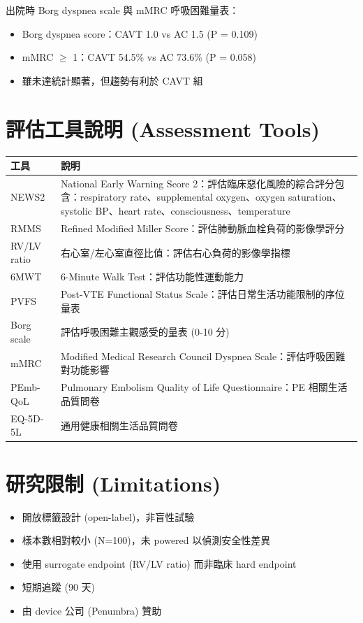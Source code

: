 \documentclass[11pt,a4paper]{article}
\begin{document}
出院時 Borg dyspnea scale 與 mMRC 呼吸困難量表：
\begin{itemize}[leftmargin=*,itemsep=2pt]
    \item Borg dyspnea score：CAVT 1.0 vs AC 1.5 (P = 0.109)
    \item mMRC $\geq$ 1：CAVT 54.5\% vs AC 73.6\% (P = 0.058)
    \item 雖未達統計顯著，但趨勢有利於 CAVT 組
\end{itemize}

\section{評估工具說明 (Assessment Tools)}

\begin{longtable}{p{3.5cm}p{10.5cm}}
\toprule
\textbf{工具} & \textbf{說明} \\
\midrule
\endfirsthead
\bottomrule
\endfoot
NEWS2 & National Early Warning Score 2：評估臨床惡化風險的綜合評分\newline 包含：respiratory rate、supplemental oxygen、oxygen saturation、systolic BP、heart rate、consciousness、temperature \\
\midrule
RMMS & Refined Modified Miller Score：評估肺動脈血栓負荷的影像學評分 \\
\midrule
RV/LV ratio & 右心室/左心室直徑比值：評估右心負荷的影像學指標 \\
\midrule
6MWT & 6-Minute Walk Test：評估功能性運動能力 \\
\midrule
PVFS & Post-VTE Functional Status Scale：評估日常生活功能限制的序位量表 \\
\midrule
Borg scale & 評估呼吸困難主觀感受的量表 (0-10 分) \\
\midrule
mMRC & Modified Medical Research Council Dyspnea Scale：評估呼吸困難對功能影響 \\
\midrule
PEmb-QoL & Pulmonary Embolism Quality of Life Questionnaire：PE 相關生活品質問卷 \\
\midrule
EQ-5D-5L & 通用健康相關生活品質問卷 \\
\bottomrule
\end{longtable}

\section{研究限制 (Limitations)}

\begin{itemize}[leftmargin=*,itemsep=2pt]
    \item 開放標籤設計 (open-label)，非盲性試驗
    \item 樣本數相對較小 (N=100)，未 powered 以偵測安全性差異
    \item 使用 surrogate endpoint (RV/LV ratio) 而非臨床 hard endpoint
    \item 短期追蹤 (90 天)
    \item 由 device 公司 (Penumbra) 贊助
\end{itemize}
\end{document}
